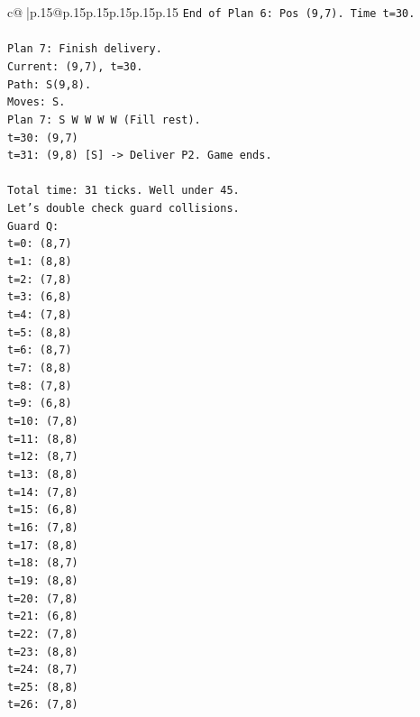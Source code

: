 \documentclass{article}
\begin{document}
{\begin{supertabular}{c@{$\;$}|p{.15\linewidth}@{}p{.15\linewidth}p{.15\linewidth}p{.15\linewidth}p{.15\linewidth}p{.15\linewidth}}
{{{\texttt{End of Plan 6: Pos (9,7). Time t=30.} \\
\\ 
\texttt{Plan 7: Finish delivery.} \\
\texttt{Current: (9,7), t=30.} \\
\texttt{Path: S(9,8).} \\
\texttt{Moves: S.} \\
\texttt{Plan 7: S W W W W (Fill rest).} \\
\texttt{t=30: (9,7)} \\
\texttt{t=31: (9,8) {[}S{]} {-}> Deliver P2. Game ends.} \\
\\ 
\texttt{Total time: 31 ticks. Well under 45.} \\
\texttt{Let's double check guard collisions.} \\
\texttt{Guard Q:} \\
\texttt{t=0: (8,7)} \\
\texttt{t=1: (8,8)} \\
\texttt{t=2: (7,8)} \\
\texttt{t=3: (6,8)} \\
\texttt{t=4: (7,8)} \\
\texttt{t=5: (8,8)} \\
\texttt{t=6: (8,7)} \\
\texttt{t=7: (8,8)} \\
\texttt{t=8: (7,8)} \\
\texttt{t=9: (6,8)} \\
\texttt{t=10: (7,8)} \\
\texttt{t=11: (8,8)} \\
\texttt{t=12: (8,7)} \\
\texttt{t=13: (8,8)} \\
\texttt{t=14: (7,8)} \\
\texttt{t=15: (6,8)} \\
\texttt{t=16: (7,8)} \\
\texttt{t=17: (8,8)} \\
\texttt{t=18: (8,7)} \\
\texttt{t=19: (8,8)} \\
\texttt{t=20: (7,8)} \\
\texttt{t=21: (6,8)} \\
\texttt{t=22: (7,8)} \\
\texttt{t=23: (8,8)} \\
\texttt{t=24: (8,7)} \\
\texttt{t=25: (8,8)} \\
\texttt{t=26: (7,8)} \\
}}}
\end{supertabular}}
\end{document}
